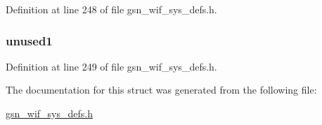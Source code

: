 Definition at line 248 of file gsn\_\-wif\_\-sys\_\-defs.h.

\hypertarget{a00348_a186854790696dd9afc23f7648fa363ed}{
\subsubsection[{unused1}]{ {\bf unused1}}}
\label{a00348_a186854790696dd9afc23f7648fa363ed}


Definition at line 249 of file gsn\_\-wif\_\-sys\_\-defs.h.



The documentation for this struct was generated from the following file:\begin{DoxyCompactItemize}
\item 
\hyperlink{a00612}{gsn\_\-wif\_\-sys\_\-defs.h}\end{DoxyCompactItemize}
